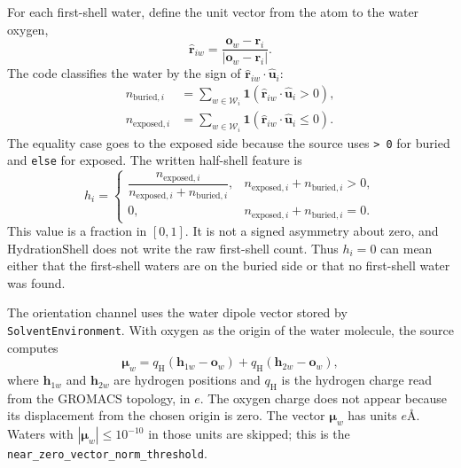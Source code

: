 \documentclass[11pt]{article}
\begin{document}
For each first-shell water, define the unit vector from the atom to the water
oxygen,
\begin{equation}
  \hat{\bm r}_{iw} =
  \frac{\bm o_w-\bm r_i}{|\bm o_w-\bm r_i|}.
  \label{eq:rhat}
\end{equation}
The code classifies the water by the sign of
\(\hat{\bm r}_{iw}\cdot\hat{\bm u}_i\):
\begin{align}
  n_{\mathrm{buried},i} &=
  \sum_{w\in\mathcal W_i}
  \mathbf 1(\hat{\bm r}_{iw}\cdot\hat{\bm u}_i > 0),\\
  n_{\mathrm{exposed},i} &=
  \sum_{w\in\mathcal W_i}
  \mathbf 1(\hat{\bm r}_{iw}\cdot\hat{\bm u}_i \le 0).
  \label{eq:counts}
\end{align}
The equality case goes to the exposed side because the source uses
\texttt{> 0} for buried and \texttt{else} for exposed. The written
half-shell feature is
\begin{equation}
  h_i =
  \begin{cases}
    \dfrac{n_{\mathrm{exposed},i}}
          {n_{\mathrm{exposed},i}+n_{\mathrm{buried},i}},
       & n_{\mathrm{exposed},i}+n_{\mathrm{buried},i}>0,\\[1.1em]
    0, & n_{\mathrm{exposed},i}+n_{\mathrm{buried},i}=0 .
  \end{cases}
  \label{eq:half-shell}
\end{equation}
This value is a fraction in \([0,1]\). It is not a signed asymmetry about zero,
and HydrationShell does not write the raw first-shell count. Thus \(h_i=0\) can
mean either that the first-shell waters are on the buried side or that no
first-shell water was found.

The orientation channel uses the water dipole vector stored by
\texttt{SolventEnvironment}. With oxygen as the origin of the water molecule,
the source computes
\begin{equation}
  \bm\mu_w =
    q_{\mathrm H}(\bm h_{1w}-\bm o_w)
  + q_{\mathrm H}(\bm h_{2w}-\bm o_w),
  \label{eq:dipole}
\end{equation}
where \(\bm h_{1w}\) and \(\bm h_{2w}\) are hydrogen positions and
\(q_{\mathrm H}\) is the hydrogen charge read from the GROMACS topology, in
\(\si{\elementarycharge}\). The oxygen charge does not appear because its
displacement from the chosen origin is zero. The vector \(\bm\mu_w\) has units
\(\si{\elementarycharge\angstrom}\). Waters with
\(|\bm\mu_w|\le 10^{-10}\) in those units are skipped; this is the
\texttt{near\_zero\_vector\_norm\_threshold}.
\end{document}
